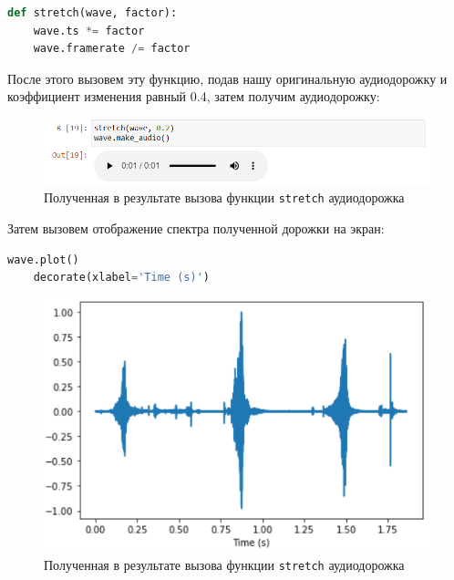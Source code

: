 \documentclass[a4paper]{article}
\begin{document}
\begin{lstlisting}[language=Python, caption= Функция \texttt{stretch}]
    def stretch(wave, factor):
    wave.ts *= factor
    wave.framerate /= factor
\end{lstlisting}
            
            После этого вызовем эту функцию, подав нашу оригинальную аудиодорожку и коэффициент изменения равный 0.4, затем получим аудиодорожку:
            
            \begin{figure}[H]
                \centering
                \includegraphics[width=\textwidth]{stretch_audio.png}
                \caption{Полученная в результате вызова функции \texttt{stretch} аудиодорожка}
                \label{fig:stretch_audio}
            \end{figure}
            
            Затем вызовем отображение спектра полученной дорожки на экран:
            
\begin{lstlisting}[language=Python, caption= Вывод на экран полученной после вызова функции \texttt{stretch} аудиодорожки]
    wave.plot()
    decorate(xlabel='Time (s)')
\end{lstlisting}
            
            \begin{figure}[H]
                \centering
                \includegraphics[width=\textwidth]{stretch_audio_result.png}
                \caption{Полученная в результате вызова функции \texttt{stretch} аудиодорожка}
                \label{fig:stretch_audio_result}
            \end{figure}
            
\end{document}
